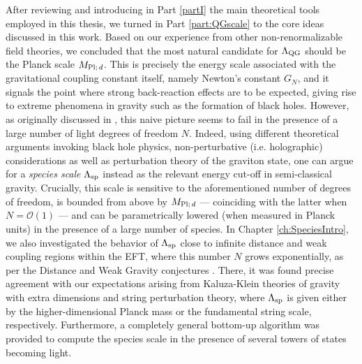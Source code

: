 After reviewing and introducing in Part \ref{partI} the main theoretical tools employed in this thesis, we turned in Part \ref{part:QGscale} to the core ideas discussed in this work. Based on our experience from other non-renormalizable field theories, we concluded that the most natural candidate for $\Lambda_{\text{QG}}$ should be the Planck scale $M_{\text{Pl;}\, d}$. This is precisely the energy scale associated with the gravitational coupling constant itself, namely Newton's constant $G_N$, and it signals the point where strong back-reaction effects are to be expected, giving rise to extreme phenomena in gravity such as the formation of black holes. However, as originally discussed in \cite{Han:2004wt, Dvali:2007hz, Dvali:2007wp}, this naive picture seems to fail in the presence of a large number of light degrees of freedom $N$. Indeed, using different theoretical arguments invoking black hole physics, non-perturbative (i.e. holographic) considerations as well as perturbation theory of the graviton state, one can argue for a \emph{species scale} $\Lambda_{\text{sp}}$ instead as the relevant energy cut-off in semi-classical gravity. Crucially, this scale is sensitive to the aforementioned number of degrees of freedom, is bounded from above by $M_{\text{Pl;}\, d}$ — coinciding with the latter when $ N= \mathcal{O}(1)$ — and can be parametrically lowered (when measured in Planck units) in the presence of a large number of species. In Chapter \ref{ch:SpeciesIntro}, we also investigated the behavior of $\Lambda_{\text{sp}}$ close to infinite distance and weak coupling regions within the EFT, where this number $N$ grows exponentially, as per the Distance \cite{Ooguri:2006in} and Weak Gravity conjectures \cite{Heidenreich:2015nta, Heidenreich:2016aqi, Montero:2016tif, Andriolo:2018lvp}. There, it was found precise agreement with our expectations arising from Kaluza-Klein theories of gravity with extra dimensions and string perturbation theory, where $\Lambda_{\text{sp}}$ is given either by the higher-dimensional Planck mass or the fundamental string scale, respectively. Furthermore, a completely general bottom-up algorithm was provided to compute the species scale in the presence of several towers of states becoming light.


